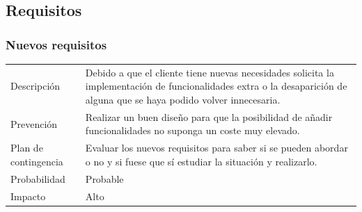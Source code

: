 \clearpage

\subsection{Requisitos}
\subsubsection{Nuevos requisitos}
\begin{table}[H]
    \begin{center}
        \begin{tabular}{l p{8cm}}
            Descripci\'{o}n                 & Debido a que el cliente tiene nuevas necesidades solicita la
            								  implementaci\'{o}n de funcionalidades extra o la desaparici\'{o}n de alguna que se 
            								  haya podido volver innecesaria. \\
            Prevenci\'{o}n                  & Realizar un buen dise\~{n}o para que la posibilidad de añadir
            								  funcionalidades no suponga un coste muy elevado. \\ 
            Plan de contingencia            & Evaluar los nuevos requisitos para saber si se pueden
            								  abordar o no y si fuese que s\'i estudiar la situación y realizarlo. \\
            Probabilidad                    & Probable \\
            Impacto                         & Alto \\
        \end{tabular}
    \end{center}
    
\end{table}

